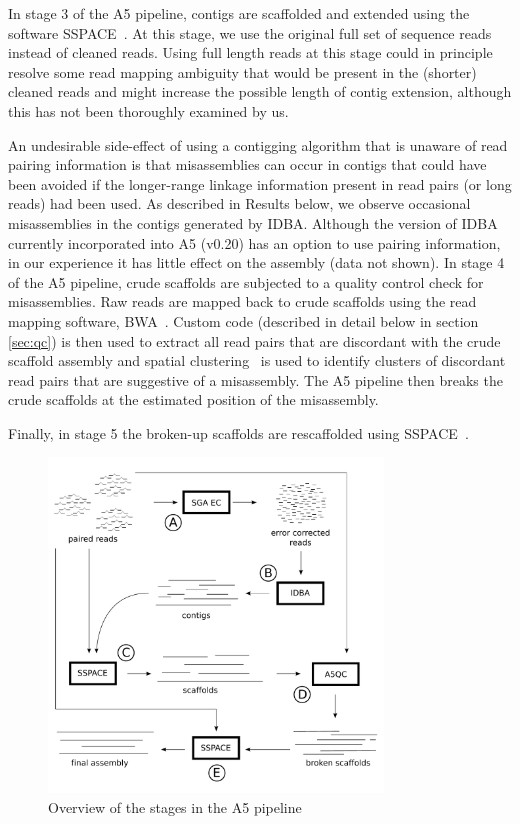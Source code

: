 \documentclass{bioinfo}
\begin{document}
\begin{methods}
In stage 3 of the A5 pipeline, contigs are scaffolded and extended using the software SSPACE~\citep{Boetzer2011}. At this stage, we use the original
full set of sequence reads instead of cleaned reads. Using full length reads at this stage could in principle resolve some read mapping ambiguity 
that would be present in the (shorter) cleaned reads and might increase the possible length of contig extension, although this has not been thoroughly
examined by us.

An undesirable side-effect of using a contigging algorithm that is unaware of read pairing information is that misassemblies can occur in contigs 
that could have been avoided if the longer-range linkage information present in read pairs (or long reads) had been used.  As described in Results 
below, we observe occasional misassemblies in the contigs generated by IDBA. Although the version of IDBA currently incorporated into A5 (v0.20) has
an option to use pairing information, in our experience it has little effect on the assembly (data not shown). In stage 4 of the A5 pipeline, crude 
scaffolds are subjected to a quality control check for misassemblies. Raw reads are mapped back to crude scaffolds using the read mapping software,
BWA~\citep{bwa}. Custom code (described in detail below in section \ref{sec:qc}) is then used to extract all read pairs that are discordant with the 
crude scaffold assembly and spatial clustering~\citep{DBSCAN} is used to identify clusters of discordant read pairs that are suggestive of a 
misassembly. The A5 pipeline then breaks the crude scaffolds at the estimated position of the misassembly.

Finally, in stage 5 the broken-up scaffolds are rescaffolded using SSPACE~\citep{Boetzer2011}.
\end{methods}


\begin{figure}[t]
\includegraphics[width=3.5in]{a5pipeline-diagram.pdf}
\vspace{-1cm}
\caption{Overview of the stages in the A5 pipeline}\label{fig:01}
\end{figure}
\end{document}
